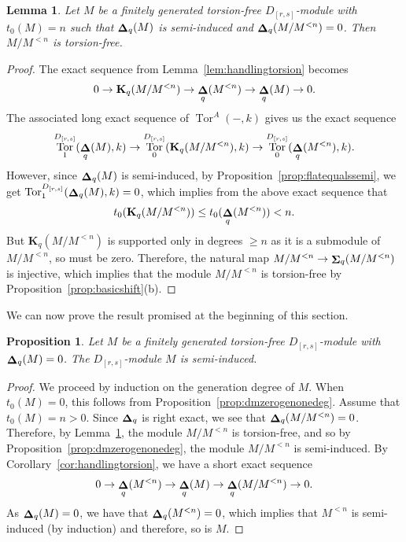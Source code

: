 \documentclass[12pt]{amsart}
\newcommand{\bK}{\mathbf{K}}
\DeclareMathOperator{\Tor}{Tor}
\DeclareMathOperator{\Sh}{\bf{\Sigma}}
\DeclareMathOperator{\De}{\bf{\Delta}}
\newcommand{\Drs}{D_{[r,s]}}
\newcommand{\mShq}{\Sh_{q}}
\newcommand{\mDeq}{\De_{q}}
\newcommand{\bKq}{{{\bK}_{q}}}
\newcommand{\mKq}{\bKq}
\numberwithin{equation}{section}
\newtheorem{proposition}[equation]{Proposition}
\newtheorem{lemma}[equation]{Lemma}
\theoremstyle{definition}
\theoremstyle{plain}
\begin{document}
\begin{lemma}\label{lem:torsionfreequotient}
    Let $M$ be a finitely generated torsion-free $\Drs$-module with $t_0(M) = n$ such that $\mDeq(M)$ is semi-induced and $\mDeq(M/M^{<n}) = 0$. Then $M/M^{<n}$ is torsion-free.
\end{lemma}
\begin{proof}
    The exact sequence from Lemma~\ref{lem:handlingtorsion} becomes
    \begin{displaymath}
    0 \to \mKq(M/M^{<n}) \to \mDeq(M^{<n}) \to \mDeq(M) \to 0.
    \end{displaymath} 
    The associated long exact sequence of $\Tor^A(-,k)$ gives us the exact sequence
    \begin{displaymath}
    \Tor_1^{\Drs}(\mDeq(M), k) \to \Tor_0^{\Drs}(\mKq(M/M^{<n}),k) \to \Tor_0^{\Drs}(\mDeq(M^{<n}),k).
    \end{displaymath}
    However, since $\mDeq(M)$ is semi-induced, by Proposition~\ref{prop:flatequalssemi}, we get $\Tor_1^{\Drs}(\mDeq(M), k) = 0$, which implies from the above exact sequence that 
    \begin{displaymath}
    t_0(\mKq(M/M^{<n})) \leq t_0(\mDeq(M^{<n})) < n.
    \end{displaymath}
    But $\mKq(M/M^{<n})$ is supported only in degrees $\ge n$ as it is a submodule of $M/M^{<n}$, so must be zero. Therefore, the natural map $M/M^{<n} \to \mShq(M/M^{<n})$ is injective, which implies that the module $M/M^{<n}$ is torsion-free by Proposition~\ref{prop:basicshift}(b).
\end{proof}
We can now prove the result promised at the beginning of this section.
\begin{proposition}\label{prop:dmzeroisflat}
Let $M$ be a finitely generated torsion-free $\Drs$-module with $\mDeq(M) = 0$. The $\Drs$-module $M$ is semi-induced.
\end{proposition}
\begin{proof}
    We proceed by induction on the generation degree of $M$.
    When $t_0(M) = 0$, this follows from Proposition~\ref{prop:dmzerogenonedeg}.
    Assume that $t_0(M) = n > 0$. Since $\mDeq$ is right exact, we see that $\mDeq(M/M^{<n}) = 0$. Therefore, by Lemma~\ref{lem:torsionfreequotient}, the module $M/M^{<n}$ is torsion-free, and so by Proposition~\ref{prop:dmzerogenonedeg}, the module $M/M^{<n}$ is semi-induced. By Corollary~\ref{cor:handlingtorsion}, we have a short exact sequence 
    \begin{displaymath}
    0 \to \mDeq(M^{<n}) \to \mDeq(M) \to \mDeq(M/M^{<n}) \to 0.
    \end{displaymath}
    As $\mDeq(M)=0$, we have that $\mDeq(M^{<n}) = 0$, which implies that $M^{<n}$ is semi-induced (by induction) and therefore, so is $M$. 
\end{proof}
\end{document}
